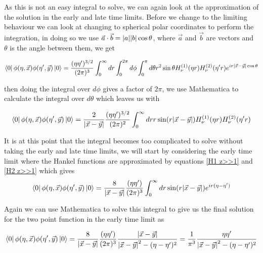 \documentclass[a4paper,11pt]{article}
\numberwithin{equation}{section}
\numberwithin{figure}{section}
\begin{document}
\begin{large}
As this is not an easy integral to solve, we can again look at the approximation of the solution in the early and late time limits. Before we change to the limiting behaviour we can look at changing to spherical polar coordinates to perform the integration, in doing so we use $\Vec{a}\cdot\Vec{b}=\abs{a}\abs{b}\cos \theta$, where $\Vec{a}$ and $\Vec{b}$ are vectors and $\theta$ is the angle between them, we get

\begin{equation}
\label{2pointsolsp}    
    \bra{0} \phi(\eta,\Vec{x})\phi(\eta',\Vec{y})\ket{0}=\frac{(\eta\eta')^{3/2}}{(2\pi)^3}\int^\infty_0 dr\int_0^{2\pi} d\phi \int_0^\pi d\theta r^2 \sin \theta H^{(1)}_\nu(\eta r)H^{(2)}_\nu(\eta'r)e^{i r \abs{\Vec{x}-\Vec{y}}\cos\theta}
\end{equation}

then doing the integral over $d\phi$ gives a factor of $2\pi$, we use Mathematica to calculate the integral over $d\theta$ which leaves us with

\begin{equation}
\label{2pointsolr}    
    \bra{0} \phi(\eta,\Vec{x})\phi(\eta',\Vec{y})\ket{0}=\frac{2}{\abs{\Vec{x}-\Vec{y}}}\frac{(\eta\eta')^{3/2}}{(2\pi)^2}\int^\infty_0 dr r \sin(r \abs{\Vec{x}-\Vec{y}}) H^{(1)}_\nu(\eta r)H^{(2)}_\nu(\eta'r)
\end{equation}

It is at this point that the integral becomes too complicated to solve without taking the early and late time limits, we will start by considering the early time limit where the Hankel functions are approximated by equations \eqref{H1 z>>1} and \eqref{H2 z>>1} which gives 
\begin{equation}
\label{2pointsol eta>>1}    
    \bra{0} \phi(\eta,\Vec{x})\phi(\eta',\Vec{y})\ket{0}=\frac{8}{\abs{\Vec{x}-\Vec{y}}}\frac{(\eta\eta')}{(2\pi)^3}\int^\infty_0 dr  \sin(r \abs{\Vec{x}-\Vec{y}}) e^{ir(\eta-\eta')} 
\end{equation}

\newpage

Again we can use Mathematica to solve this integral to give us the final solution for the two point function in the early time limit as

\begin{equation}
\label{2pointfullsol eta>>1}    
    \bra{0} \phi(\eta,\Vec{x})\phi(\eta',\Vec{y})\ket{0}=\frac{8}{\abs{\Vec{x}-\Vec{y}}}\frac{(\eta\eta')}{(2\pi)^3} \frac{\abs{\Vec{x}-\Vec{y}}}{\abs{\Vec{x}-\Vec{y}}^2-(\eta-\eta')^2}=\frac{1}{\pi^3} \frac{\eta\eta'}{\abs{\Vec{x}-\Vec{y}}^2-(\eta-\eta')^2}
\end{equation}


\end{large}
\end{document}
